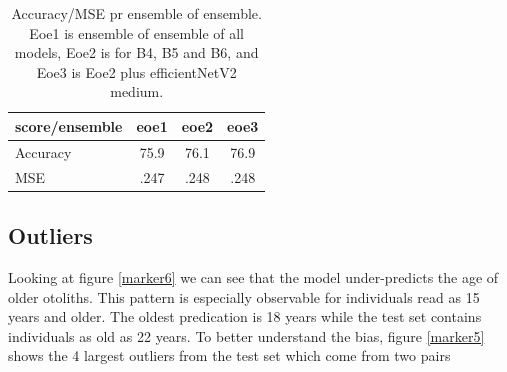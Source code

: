 \documentclass[10pt,letterpaper]{article}
\begin{document}
\begin{center}
\begin{table}[hbt!]
\caption{Accuracy/MSE pr ensemble of ensemble.
Eoe1 is ensemble of ensemble of all models, Eoe2 is for B4, B5 and B6,
and Eoe3 is Eoe2 plus efficientNetV2 medium.}
\begin{tabular}{ |l|c|c|c| }
\hline
score/ensemble & eoe1 & eoe2 & eoe3  \\ \hline
Accuracy & 75.9 & 76.1 & 76.9 \\ 
MSE & .247 & .248 & .248  \\ 
\hline
\end{tabular}
\label{table10}
\end{table}
\end{center}

\subsection*{Outliers}

Looking at figure \ref{marker6} we can see that the model under-predicts the age of older otoliths. This pattern is especially observable for individuals read as 15 years and older. The oldest predication is 18 years while the test set contains individuals as old as 22 years. To better understand the bias, figure \ref{marker5} shows the 4 largest outliers from the test set which come from two pairs
\end{document}
